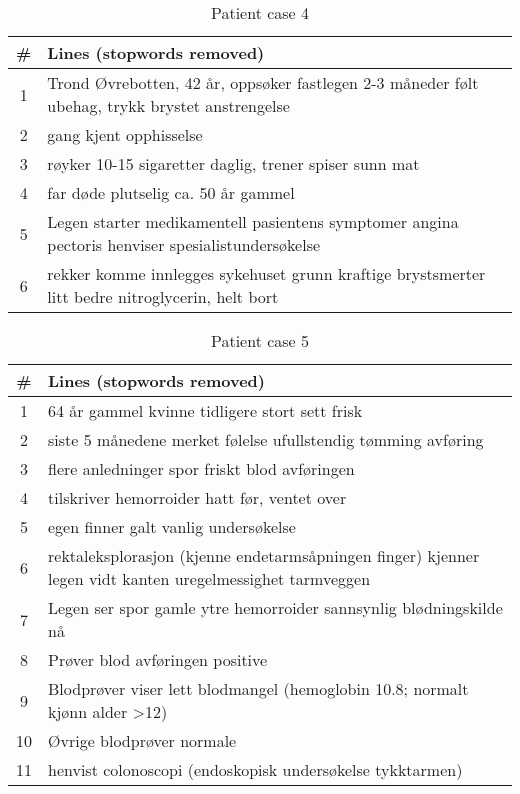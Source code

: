 \begin{table}[htbp] \footnotesize \center
\caption{Patient case 4\label{tab:case4}}
\begin{tabularx}{\textwidth}{c X}
    \toprule
    \# & Lines (stopwords removed) \\
    \midrule
    1 & Trond Øvrebotten, 42 år, oppsøker fastlegen 2-3 måneder følt ubehag, trykk brystet anstrengelse \\
    2 & gang kjent opphisselse \\
    3 & røyker 10-15 sigaretter daglig, trener spiser sunn mat \\
    4 & far døde plutselig ca. 50 år gammel \\
    5 & Legen starter medikamentell pasientens symptomer angina pectoris henviser spesialistundersøkelse \\
    6 & rekker komme innlegges sykehuset grunn kraftige brystsmerter litt bedre nitroglycerin, helt bort \\
    \bottomrule
\end{tabularx}
\end{table}

\begin{table}[htbp] \footnotesize \center
\caption{Patient case 5\label{tab:case5}}
\begin{tabularx}{\textwidth}{c X}
    \toprule
    \# & Lines (stopwords removed) \\
    \midrule
    1 & 64 år gammel kvinne tidligere stort sett frisk \\
    2 & siste 5 månedene merket følelse ufullstendig tømming avføring \\
    3 & flere anledninger spor friskt blod avføringen \\
    4 & tilskriver hemorroider hatt før, ventet over \\
    5 & egen finner galt vanlig undersøkelse \\
    6 & rektaleksplorasjon (kjenne endetarmsåpningen finger) kjenner legen vidt kanten uregelmessighet tarmveggen \\
    7 & Legen ser spor gamle ytre hemorroider sannsynlig blødningskilde nå \\
    8 & Prøver blod avføringen positive \\
    9 & Blodprøver viser lett blodmangel (hemoglobin 10.8; normalt kjønn alder >12) \\
    10 & Øvrige blodprøver normale \\
    11 & henvist colonoscopi (endoskopisk undersøkelse tykktarmen) \\
    \bottomrule
\end{tabularx}
\end{table}

